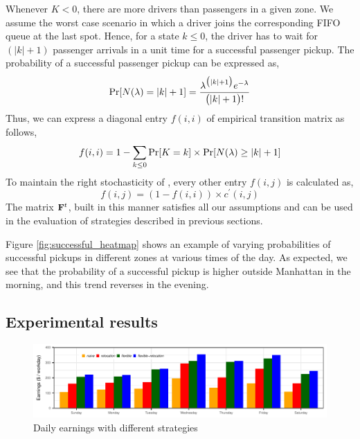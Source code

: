 Whenever %
$K<0$, there are more drivers than passengers in a given zone. We assume the worst case scenario in which a driver joins the corresponding FIFO queue at the last spot. Hence, for a state $k \leq 0$, the driver has to wait for $(|k| + 1)$ passenger arrivals in a unit time for a successful passenger pickup. The probability of a successful passenger pickup can be expressed as,
\begin{equation}
\Pr[N(\lambda) = |k| + 1] = \frac{\lambda^{\big(|k|+1\big)} e^{-\lambda}}{\big(|k| + 1\big)!}
\end{equation}
Thus, we can express a diagonal entry $f(i,i)$ of empirical transition matrix as follows,
\begin{equation}
f(i,i) = 1 - \sum_{k \leq 0} \Pr[K = k] \times \Pr[N(\lambda) \geq |k| + 1]
\end{equation}
To maintain the right stochasticity of {\empiricaltransitionmatrix}, every other entry $f(i,j)$ is calculated as,
\begin{equation}
f(i,j) = (1 - f(i,i)) \times c^\prime(i,j)
\end{equation}
The matrix ${\mathbf{F}}^t$, built in this manner satisfies all our assumptions and can be used in the evaluation of strategies described in previous sections. 

Figure \ref{fig:successful_heatmap} shows an example of varying probabilities of successful pickups in different zones at various times of the day. As expected, we see that the probability of a successful pickup is higher outside Manhattan in the morning, and this trend reverses in the evening.

\fi

\subsection{Experimental results}
\begin{figure}
	\centering
	\includegraphics{figures/daily_earnings.pdf}
	\caption{Daily earnings with different strategies}
	\label{fig:daily_earnings}
\end{figure}

